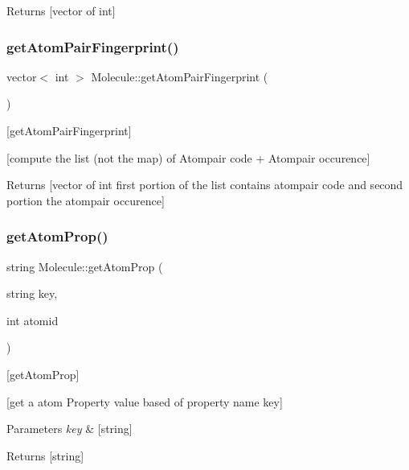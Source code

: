 \begin{DoxyReturn}{Returns}
\mbox{[}vector of int\mbox{]} 
\end{DoxyReturn}
\mbox{\label{class_molecule_abfb8fda0aff9f7d749257badadd5d6d5}} 
\subsubsection{\texorpdfstring{get\+Atom\+Pair\+Fingerprint()}{getAtomPairFingerprint()}}
{\footnotesize\ttfamily vector$<$ int $>$ Molecule\+::get\+Atom\+Pair\+Fingerprint (\begin{DoxyParamCaption}{ }\end{DoxyParamCaption})}



\mbox{[}get\+Atom\+Pair\+Fingerprint\mbox{]} 

\mbox{[}compute the list (not the map) of Atompair code + Atompair occurence\mbox{]} \begin{DoxyReturn}{Returns}
\mbox{[}vector of int first portion of the list contains atompair code and second portion the atompair occurence\mbox{]} 
\end{DoxyReturn}
\mbox{\label{class_molecule_acb057213561817b5e78a1e5e5845ae8f}} 
\subsubsection{\texorpdfstring{get\+Atom\+Prop()}{getAtomProp()}}
{\footnotesize\ttfamily string Molecule\+::get\+Atom\+Prop (\begin{DoxyParamCaption}\item[{string}]{key,  }\item[{int}]{atomid }\end{DoxyParamCaption})}



\mbox{[}get\+Atom\+Prop\mbox{]} 

\mbox{[}get a atom Property value based of property name key\mbox{]}


\begin{DoxyParams}{Parameters}
{\em key} & \mbox{[}string\mbox{]} \\
\hline
\end{DoxyParams}
\begin{DoxyReturn}{Returns}
\mbox{[}string\mbox{]} 
\end{DoxyReturn}
\mbox{\label{class_molecule_aa995ba2f208be94be9d1bbb756cb1e91}} 
